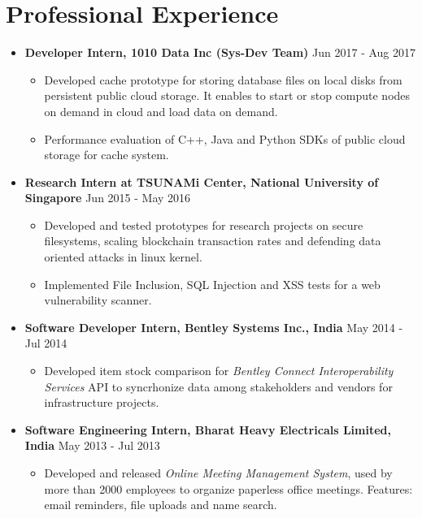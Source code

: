 \documentclass{article}
\newcommand{\bi}{\vspace{-1mm}\begin{itemize}[align=left,leftmargin=*, rightmargin=80pt, labelindent=0pt,labelsep=2pt, label={-}, nosep]}
\newcommand{\ei}{\end{itemize}}
\begin{document}
\section*{Professional Experience}
\begin{itemize}
    \item \textbf{Developer Intern, 1010 Data Inc (Sys-Dev Team)} {\hfill Jun 2017 - Aug 2017}
    \bi
        \item Developed cache prototype for storing database files on local disks from persistent public cloud storage. It enables to start or stop compute nodes on demand in cloud and load data on demand.
        
        \item Performance evaluation of C++, Java and Python SDKs of public cloud storage for cache system.
    \ei

    \item \textbf{Research Intern at TSUNAMi Center, National University of Singapore} {\hfill Jun 2015 - May 2016}
    \bi
        \item Developed and tested prototypes for research projects on secure filesystems, scaling blockchain transaction rates and defending data oriented attacks in linux kernel.

        \item Implemented File Inclusion, SQL Injection and XSS tests for a web vulnerability scanner.
    \ei
    
    \item \textbf{Software Developer Intern, Bentley Systems Inc., India} {\hfill May 2014 - Jul 2014}
    \bi
        \item Developed item stock comparison for \textit{Bentley Connect Interoperability Services} API to syncrhonize data among stakeholders and vendors for infrastructure projects.
    \ei

    \item \textbf{Software Engineering Intern, Bharat Heavy Electricals Limited, India} {\hfill May 2013 - Jul 2013}
    \bi
        \item Developed and released \textit{Online Meeting Management System}, used by more than 2000 employees to organize paperless office meetings. Features: email reminders, file uploads and name search.
    \ei 
\end{itemize}

\vspace{-2mm}
\end{document}
